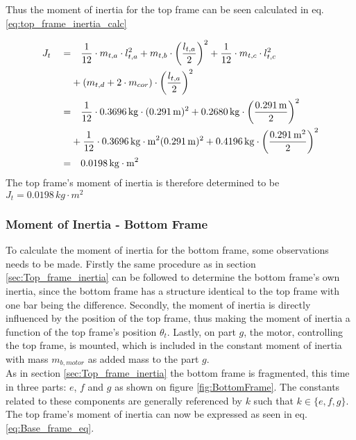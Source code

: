 \documentclass[../../main]{subfiles}
\begin{document}
Thus the moment of inertia for the top frame can be seen calculated in eq. \eqref{eq:top_frame_inertia_calc}

\begin{equation}
  \centering
    \label{eq:top_frame_inertia_calc}
  \begin{split}
      J_t  \quad  =&  \quad \frac{1}{12} \cdot m_{t,a} \cdot l_{t,a}^2 + m_{t,b} \cdot \left(\frac{l_{t,a}}{2}\right)^2 + \frac{1}{12} \cdot m_{t,c}\cdot l_{t,c}^2\\
      &+ (m_{t,d} + 2 \cdot m_{cor}) \cdot \left( \frac{l_{t,a}}{2}\right)^2 \\
      =& \quad \frac{1}{12} \cdot 0.3696 \si{\,kg}  \cdot (0.291 \si{\,m})^2
      + 0.2680 \si{\,kg} \cdot \left(\frac{0.291 \si{\,m}}{2}\right)^2 \\
      &+ \frac{1}{12} \cdot 0.3696 \si{\,kg\cdot m^2} (0.291 \si{\,m})^2
      + 0.4196 \si{\,kg} \cdot \left( \frac{0.291\si{\,m}^2}{2} \right)^2 \\
      =& \quad 0.0198 \si{\,kg\cdot m^2}
  \end{split}
\end{equation}
The top frame's moment of inertia is therefore determined to be
\newline $J_{t} = 0.0198 \si{\,kg\cdot m^2}$

\subsubsection{Moment of Inertia - Bottom Frame}
\label{sec:moment_botom}
To calculate the moment of inertia for the bottom frame, some observations needs to be made. Firstly the same procedure as in section \ref{sec:Top_frame_inertia} can be followed to determine the bottom frame's own inertia, since the bottom frame has a structure identical to the top frame with one bar being the difference. Secondly, the moment of inertia is directly influenced by the position of the top frame, thus making the moment of inertia a function of the top frame's position $\theta_t$. Lastly, on part $g$, the motor, controlling the top frame, is mounted, which is included in the constant moment of inertia with mass $m_{b,motor}$ as added mass to the part $g$.\\
As in section \ref{sec:Top_frame_inertia} the bottom frame is fragmented, this time in three parts: $e$, $f$ and $g$ as shown on figure \ref{fig:BottomFrame}. The constants related to these components are generally referenced by $k$ such that $k \in \{e,f,g\}$. The top frame's moment of inertia can now be expressed as seen in eq. \eqref{eq:Base_frame_eq}.
\end{document}
